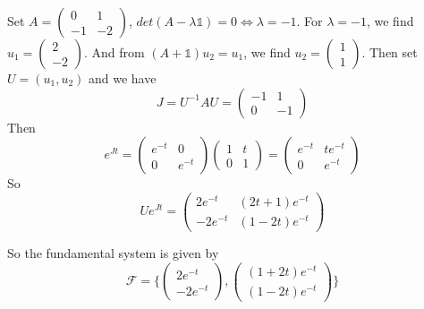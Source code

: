 \documentclass[a4paper,12pt,titlepage]{article}
\begin{document}
Set $A=\begin{pmatrix}
0&1\\
-1&-2
\end{pmatrix}$, $det(A-\lambda\mathds{1})=0\Leftrightarrow \lambda=-1$. For $\lambda=-1$, we find $u_1=\begin{pmatrix}
2\\
-2
\end{pmatrix}$. And from $(A+\mathds{1})u_2=u_1$, we find $u_2=\begin{pmatrix}
1\\
1
\end{pmatrix}$. Then set $U=(u_1,u_2)$ and we have
$$J=U^{-1}AU=\begin{pmatrix}
-1&1\\
0&-1
\end{pmatrix}$$
Then
$$e^{Jt}=\begin{pmatrix}
e^{-t}&0\\
0&e^{-t}
\end{pmatrix}\begin{pmatrix}
1&t\\
0&1
\end{pmatrix}=\begin{pmatrix}
e^{-t}&te^{-t}\\
0&e^{-t}
\end{pmatrix}$$
So $$Ue^{Jt}=\begin{pmatrix}
2e^{-t}&(2t+1)e^{-t}\\
-2e^{-t}&(1-2
t)e^{-t}
\end{pmatrix}$$

So the fundamental system is given by
$$\mathscr{F}=\lbrace\begin{pmatrix}
2e^{-t}\\
-2e^{-t}
\end{pmatrix},\begin{pmatrix}
(1+2t)e^{-t}\\
(1-2t)e^{-t}
\end{pmatrix}\rbrace$$
\end{document}
